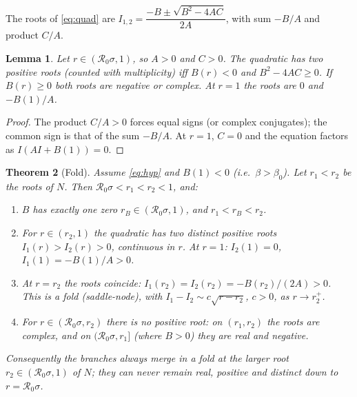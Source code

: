 \documentclass[11pt]{article}
\newtheorem{lemma}{Lemma}[section]
\newtheorem{theorem}[lemma]{Theorem}
\theoremstyle{remark}
\newcommand{\R}{\mathcal R_0}
\begin{document}
The roots of \eqref{eq:quad} are $I_{1,2}=\dfrac{-B\pm\sqrt{B^2-4AC}}{2A}$, with sum $-B/A$ and product $C/A$.

\begin{lemma}\label{lem:sign}
Let $r\in(\R\sigma,1)$, so $A>0$ and $C>0$. The quadratic has two positive roots (counted with multiplicity) iff $B(r)<0$ and $B^2-4AC\ge0$. If $B(r)\ge0$ both roots are negative or complex. At $r=1$ the roots are $0$ and $-B(1)/A$.
\end{lemma}
\begin{proof}
The product $C/A>0$ forces equal signs (or complex conjugates); the common sign is that of the sum $-B/A$. At $r=1$, $C=0$ and the equation factors as $I(AI+B(1))=0$.
\end{proof}

\begin{theorem}[Fold]\label{thm:fold}
Assume \eqref{eq:hyp} and $B(1)<0$ (i.e.\ $\beta>\beta_0$). Let $r_1<r_2$ be the roots of $N$. Then $\R\sigma<r_1<r_2<1$, and:
\begin{enumerate}
\item[(a)] $B$ has exactly one zero $r_B\in(\R\sigma,1)$, and $r_1<r_B<r_2$.
\item[(b)] For $r\in(r_2,1)$ the quadratic has two distinct positive roots $I_1(r)>I_2(r)>0$, continuous in $r$. At $r=1$: $I_2(1)=0$, $I_1(1)=-B(1)/A>0$.
\item[(c)] At $r=r_2$ the roots coincide: $I_1(r_2)=I_2(r_2)=-B(r_2)/(2A)>0$. This is a fold (saddle-node), with $I_1-I_2\sim c\sqrt{r-r_2}$, $c>0$, as $r\to r_2^+$.
\item[(d)] For $r\in(\R\sigma,r_2)$ there is no positive root: on $(r_1,r_2)$ the roots are complex, and on $(\R\sigma,r_1]$ (where $B>0$) they are real and negative.
\end{enumerate}
Consequently the branches always merge in a fold at the larger root $r_2\in(\R\sigma,1)$ of $N$; they can never remain real, positive and distinct down to $r=\R\sigma$.
\end{theorem}
\end{document}
